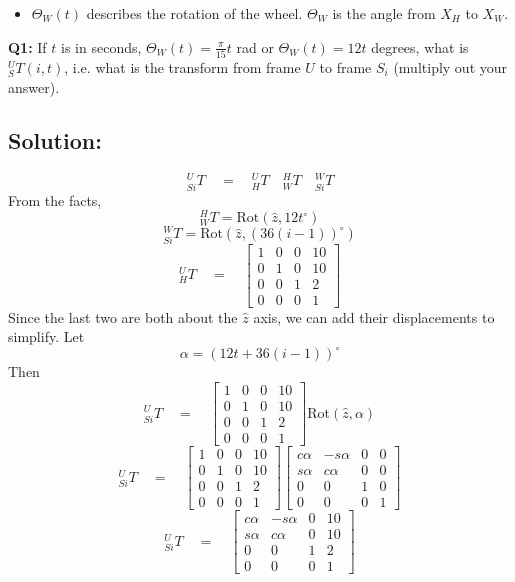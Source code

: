 \begin{Example}
\begin{itemize}
	\item $\Theta_W(t)$ describes the rotation of the wheel.  $\Theta_W$ is
the angle from $X_H$ to $X_W$.

\end{itemize}



\end{Example}


\begin{ExampleCont}
{\bf Q1:}
If $t$ is in seconds, $\Theta_W(t) =  \frac{\pi}{15}t$ rad or
$\Theta_W(t) =  12t$ degrees, what is $^U_ST(i,t)$, i.e. what is the
transform from frame $U$ to frame $S_i$ (multiply out your answer).

\subsection*{Solution:}

\[
{^U_{Si}T} \quad= \quad {^U_HT} \quad {^H_WT} \quad {^W_{Si}T}
\]
From the facts,
\[
{^H_WT} = \mathrm{Rot}(\hat{z}, 12t^{\circ})
\]
\[
{^W_{Si}T} =  \mathrm{Rot}(\hat{z}, (36(i-1))^{\circ} )
\]
\[
{^U_{H}T} \quad= \quad
\begin{bmatrix}
1 & 0 & 0 & 10	\\
0 & 1 & 0 & 10 	\\
0 & 0 & 1 &  2  \\
0 & 0 & 0 &  1
\end{bmatrix}
\]
Since the last two are both about the $\hat{z}$ axis, we can add their displacements to simplify.  Let
\[
\alpha = (12t + 36(i-1))^{\circ}
\]
Then
\[
{^U_{Si}T} \quad= \quad
\begin{bmatrix}
1 & 0 & 0 & 10	\\
0 & 1 & 0 & 10 	\\
0 & 0 & 1 &  2  \\
0 & 0 & 0 &  1
\end{bmatrix}
\mathrm{Rot}(\hat{z}, \alpha)
\]
\[
{^U_{Si}T} \quad= \quad
\begin{bmatrix}
1 & 0 & 0 & 10	\\
0 & 1 & 0 & 10 	\\
0 & 0 & 1 &  2  \\
0 & 0 & 0 &  1
\end{bmatrix}
\begin{bmatrix}
c\alpha & -s\alpha & 0 & 0	\\
s\alpha &  c\alpha & 0 & 0 	\\
0 & 0 & 1 &  0  \\
0 & 0 & 0 &  1
\end{bmatrix}
\]
\[
{^U_{Si}T} \quad= \quad
\begin{bmatrix}
c\alpha & -s\alpha & 0 & 10	\\
s\alpha &  c\alpha & 0 & 10 	\\
0 & 0 & 1 &  2  \\
0 & 0 & 0 &  1
\end{bmatrix}
\]


\end{ExampleCont}

